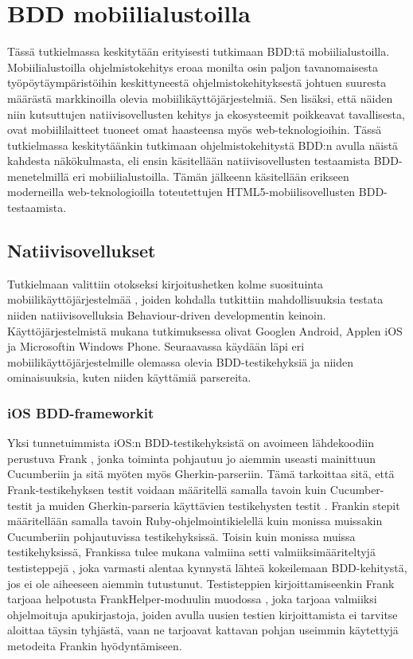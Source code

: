 \documentclass[finnish,nonumbib,nocopyright]{gradu2}
\begin{document}
\chapter{BDD mobiilialustoilla}
Tässä tutkielmassa keskitytään erityisesti tutkimaan BDD:tä mobiilialustoilla. Mobiilialustoilla ohjelmistokehitys eroaa monilta osin paljon tavanomaisesta työpöytäympäristöihin keskittyneestä ohjelmistokehityksestä johtuen suuresta määrästä markkinoilla olevia mobiilikäyttöjärjestelmiä. Sen lisäksi, että näiden niin kutsuttujen natiivisovellusten kehitys ja ekosysteemit poikkeavat tavallisesta, ovat mobiililaitteet tuoneet omat haasteensa myös web-teknologioihin. Tässä tutkielmassa keskitytäänkin tutkimaan ohjelmistokehitystä BDD:n avulla näistä kahdesta näkökulmasta, eli ensin käsitellään natiivisovellusten testaamista BDD-menetelmillä eri mobiilialustoilla. Tämän jälkeenn käsitellään erikseen moderneilla web-teknologioilla toteutettujen HTML5-mobiilisovellusten BDD-testaamista.

\section{Natiivisovellukset}
Tutkielmaan valittiin otokseksi kirjoitushetken kolme suosituinta mobiilikäyttöjärjestelmää \cite{marketshare}, joiden kohdalla tutkittiin mahdollisuuksia testata niiden natiivisovelluksia Behaviour-driven developmentin keinoin. Käyttöjärjestelmistä mukana tutkimuksessa olivat Googlen Android, Applen iOS ja Microsoftin Windows Phone. Seuraavassa käydään läpi eri mobiilikäyttöjärjestelmille olemassa olevia BDD-testikehyksiä ja niiden ominaisuuksia, kuten niiden käyttämiä parsereita.  

\subsection{iOS BDD-frameworkit}
Yksi tunnetuimmista iOS:n BDD-testikehyksistä on avoimeen lähdekoodiin perustuva Frank \cite{frank}, jonka toiminta pohjautuu jo aiemmin useasti mainittuun Cucumberiin ja sitä myöten myös Gherkin-parseriin. Tämä tarkoittaa sitä, että Frank-testikehyksen testit voidaan määritellä samalla tavoin kuin Cucumber-testit \cite{cucumber} ja muiden Gherkin-parseria käyttävien testikehysten testit \cite{gherkin}. Frankin stepit määritellään samalla tavoin Ruby-ohjelmointikielellä kuin monissa muissakin Cucumberiin pohjautuvissa testikehyksissä. Toisin kuin monissa muissa testikehyksissä, Frankissa tulee mukana valmiina setti valmiiksimääriteltyjä testisteppejä \cite{franksteps}, joka varmasti alentaa kynnystä lähteä kokeilemaan BDD-kehitystä, jos ei ole aiheeseen aiemmin tutustunut. Testisteppien kirjoittamiseenkin Frank tarjoaa helpotusta FrankHelper-moduulin muodossa \cite{frankhelper}, joka tarjoaa valmiiksi ohjelmoituja apukirjastoja, joiden avulla uusien testien kirjoittamista ei tarvitse aloittaa täysin tyhjästä, vaan ne tarjoavat kattavan pohjan useimmin käytettyjä metodeita Frankin hyödyntämiseen.
\end{document}
